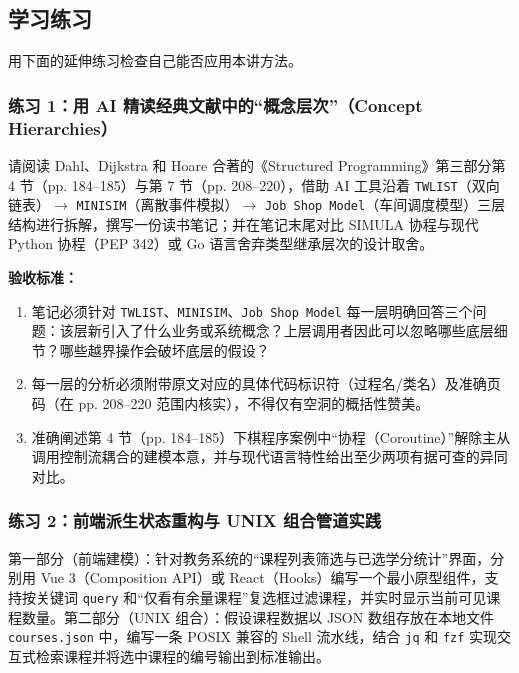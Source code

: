 \documentclass[UTF8,a4paper,11pt,fontset=fandol]{ctexart}
\begin{document}
\subsection{学习练习}

用下面的延伸练习检查自己能否应用本讲方法。

\subsubsection*{练习 1：用 AI 精读经典文献中的“概念层次”（Concept Hierarchies）}

请阅读 Dahl、Dijkstra 和 Hoare 合著的《Structured Programming》第三部分第 4 节（pp. 184–185）与第 7 节（pp. 208–220），借助 AI 工具沿着 \texttt{TWLIST}（双向链表）\ensuremath{\rightarrow} \texttt{MINISIM}（离散事件模拟）\ensuremath{\rightarrow} \texttt{Job Shop Model}（车间调度模型）三层结构进行拆解，撰写一份读书笔记；并在笔记末尾对比 SIMULA 协程与现代 Python 协程（PEP 342）或 Go 语言舍弃类型继承层次的设计取舍。

\par{}\textbf{验收标准：}

\begin{enumerate}
\item 笔记必须针对 \texttt{TWLIST}、\texttt{MINISIM}、\texttt{Job Shop Model} 每一层明确回答三个问题：该层新引入了什么业务或系统概念？上层调用者因此可以忽略哪些底层细节？哪些越界操作会破坏底层的假设？


\item 每一层的分析必须附带原文对应的具体代码标识符（过程名/类名）及准确页码（在 pp. 208–220 范围内核实），不得仅有空洞的概括性赞美。


\item 准确阐述第 4 节（pp. 184–185）下棋程序案例中“协程（Coroutine）”解除主从调用控制流耦合的建模本意，并与现代语言特性给出至少两项有据可查的异同对比。
\end{enumerate}

\subsubsection*{练习 2：前端派生状态重构与 UNIX 组合管道实践}

第一部分（前端建模）：针对教务系统的“课程列表筛选与已选学分统计”界面，分别用 Vue 3（Composition API）或 React（Hooks）编写一个最小原型组件，支持按关键词 \texttt{query} 和“仅看有余量课程”复选框过滤课程，并实时显示当前可见课程数量。第二部分（UNIX 组合）：假设课程数据以 JSON 数组存放在本地文件 \texttt{courses.json} 中，编写一条 POSIX 兼容的 Shell 流水线，结合 \texttt{jq} 和 \texttt{fzf} 实现交互式检索课程并将选中课程的编号输出到标准输出。
\end{document}

